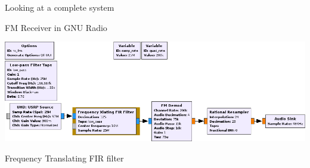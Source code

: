 \documentclass{beamer}
\begin{document}
\begin{frame}{Looking at a complete system}

  FM Receiver in GNU Radio \bigskip

  {\includegraphics[width=\textwidth]{fg_xlating_fir}}


  Frequency Translating FIR filter

\end{frame}
\end{document}
